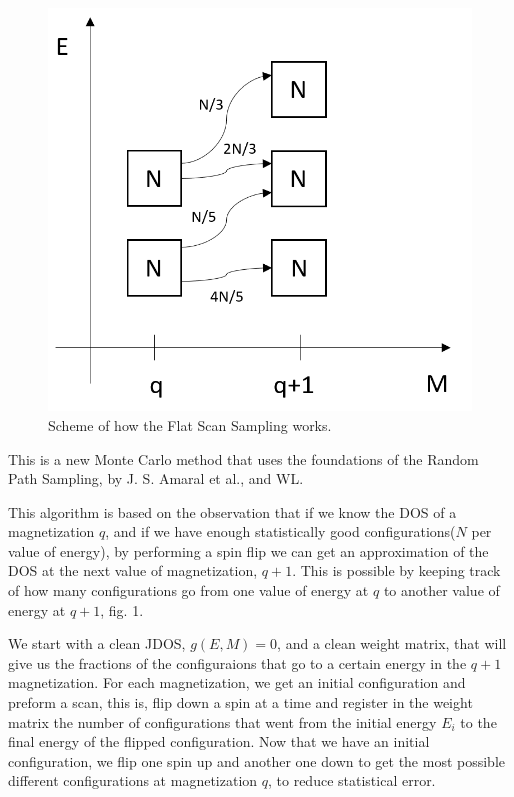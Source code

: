 \documentclass[a4paper, 11pt]{article}
\begin{document}
	\begin{figure}[b]
		\includegraphics[scale=0.26]{scheme_new_rps.png}
		\centering
		\caption{Scheme of how the Flat Scan Sampling works.}
		
	\end{figure}
	
	This is a new Monte Carlo method that uses the foundations of the Random Path Sampling\cite{RPS}, by J. S. Amaral et al., and WL\cite{WL_original}.
	
	This algorithm is based on the observation that if we know the DOS of a magnetization $q$, and if we have enough statistically good configurations($N$ per value of energy), by performing a spin flip we can get an approximation of the DOS at the next value of magnetization, $q+1$. This is possible by keeping track of how many configurations go from one value of energy at $q$ to another value of energy at $q+1$, fig. 1.
	
	We start with a clean JDOS, $g(E, M)=0$, and a clean weight matrix, that will give us the fractions of the configuraions that go to a certain energy in the $q+1$ magnetization. For each magnetization, we get an initial configuration and preform a scan, this is, flip down a spin at a time and register in the weight matrix the number of configurations that went from the initial energy $E_i$ to the final energy of the flipped configuration.
	Now that we have an initial configuration, we flip one spin up and another one down to get the most possible different configurations at magnetization $q$, to reduce statistical error. 
	
\end{document}
